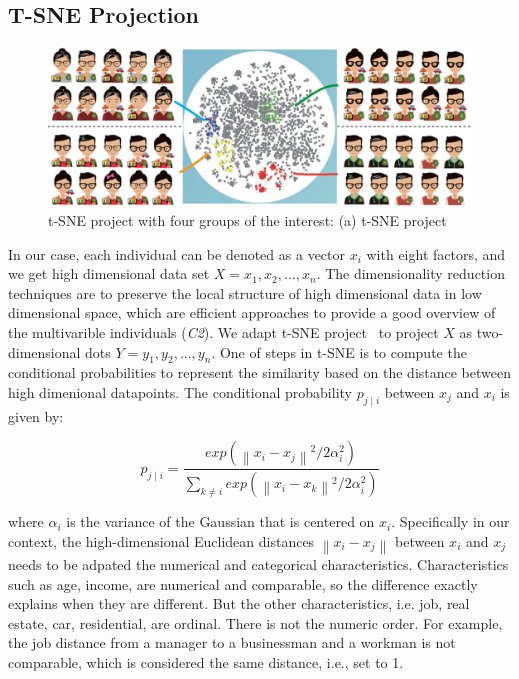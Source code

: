 \subsection{T-SNE Projection}

\begin{figure}[htb!]
 \centering %
 \includegraphics[width=\columnwidth]{pictures/tsne}
 \caption{t-SNE project with four groups of the interest: (a) t-SNE project }
 \label{fig:tsne}
\end{figure}

In our case, each individual can be denoted as a vector $x_i$ with eight factors, and we get high dimensional data set $X={x_1, x_2, ..., x_n}$. The dimensionality reduction techniques are to preserve the local structure of high dimensional data in low dimensional space, which are efficient approaches to provide a good overview of the multivarible individuals (\textit{C2}). We adapt t-SNE project~\citep{maaten2008visualizing} to project $X$ as two-dimensional dots $Y={y_1, y_2, ..., y_n}$. One of steps in t-SNE is to compute the conditional probabilities to represent the similarity based on the distance between high dimenional datapoints. The conditional probability $p_{j\mid i}$ between $x_j$ and $x_i$ is given by:

\begin{equation}
p_{j\mid i} = \frac{exp({\left \| x_i - x_j \right \|}^2/2\alpha_i ^{2})}{\sum _{k\neq i}exp({\left \| x_i - x_k \right \|}^2/2\alpha_i ^{2})}
\end{equation}

where $\alpha_i$ is the variance of the Gaussian that is centered on $x_i$. Specifically in our context, the high-dimensional Euclidean distances $\left \| x_i - x_j \right \|$ between $x_i$ and $x_j$ needs to be adpated the numerical and categorical characteristics. Characteristics such as age, income, are numerical and comparable, so the difference exactly explains when they are different. But the other characteristics, i.e. job, real estate, car, residential, are ordinal. There is not the numeric order. For example, the job distance from a manager to a businessman and a workman is not comparable, which is considered the same distance, i.e., set to 1.


